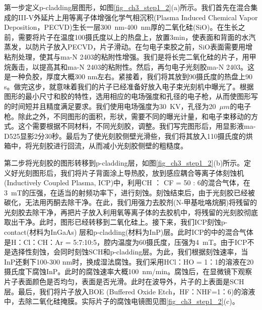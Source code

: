 第一步定义p-cladding层图形，如图\ref{fig_ch3_step1_2}(a)所示。我们首先在混合集成的III-V外延片上用等离子体增强化学气相沉积(Plasma Induced Chemical Vapor Deposition，PECVD)生长一层300~nm-400~nm厚的二氧化硅(SiO)。在生长之前，需要将片子在温度100摄氏度以上的热盘上，放置3min，使表面和背面的水汽蒸发，以防片子放入PECVD，片子滑动。在匀电子束胶之前，SiO表面需要用增粘剂处理，使其与ma-N 2403的粘附性增强。我们是将长完二氧化硅的片子，用甲烷轰击，以提高其和ma-N 2403的粘附性。然后，再匀电子光刻胶ma-N 2403\cite{man2403}。这是一种负胶，厚度大概300 nm左右。紧接着，我们将其放到90摄氏度的热盘上90 s。做完这步，就意味着我们的片子已经准备好放入电子束光刻机中曝光了。根据图形的最小尺寸和胶的特性，选用相应的电场强度和孔径的电子枪，从而使图形写的时间短并且精度满足要求。我们使用电场强度为30~KV，孔径为20~$\mu m$的电子枪。除此之外，不同图形的面积，形状，需要不同的曝光计量，和电子束移动的方式。这个需要根据不同材料，不同光刻胶，调整。我们写完图形后，用显影液ma-D525显影2分30秒。最后为了使光刻胶侧壁光滑些，我们将其放入110摄氏度的烘箱中，将光刻胶进行回流，从而减小光刻胶侧壁的粗糙度。

第二步将光刻胶的图形转移到p-cladding层，如图\ref{fig_ch3_step1_2}(b)所示。定义好光刻图形后，我们将片子背面涂上导热胶，放到感应耦合等离子体刻蚀机(Inductively Coupled Plasma, ICP)中，利用CH ： CF = 50 : 6的混合气体，在3~mT的压强，在适当的射频功率下，进行刻蚀。刻蚀结束后，由于光刻胶已经被碳化，无法用丙酮去除干净。在此，我们用强力去胶剂(N-甲基吡咯烷酮)将残留的光刻胶去除干净，再把片子放入利用氧等离子体的去胶机中，将残留的光刻胶彻底取出干净。此时，图形已经转移到二氧化硅上。接下来，我们ICP刻蚀p-contact(材料为InGaAs) 层和p-cladding(材料为InP)层。此时ICP的中的混合气体是H：Cl：CH：Ar = 5:7:10:5，腔内温度为60摄氏度，压强为4~mT。由于ICP不是选择性刻蚀，会同时刻蚀SCH和p-cladding层。为此，我们根据刻蚀速率，当InP还剩下100-300 nm时，换成湿法腐蚀。我们采用HCl：HO = 1：1的溶液在20摄氏度下腐蚀InP。此时的腐蚀速率大概100~nm/min。腐蚀后，在显微镜下观察片子表面颜色是否均匀，表面是否光滑。此时在波导外，片子的上表面是SCH层。最后，我们将片子放入BOE (Buffered Oxide Etch，HF：NHF=1：6)的溶液中，去除二氧化硅掩膜。实际片子的腐蚀电镜图见图\ref{fig_ch3_step1_2}(c)。

